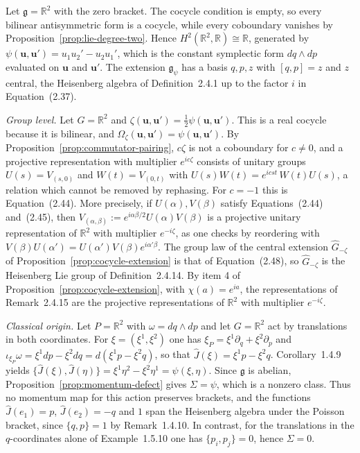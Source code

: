 \begin{example}\label{ex:heisenberg-extension}
	Let $\mathfrak{g}=\mathbb{R}^2$ with the zero bracket. The cocycle condition is empty, so every bilinear antisymmetric form is a cocycle, while every coboundary vanishes by Proposition~\ref{prop:lie-degree-two}. Hence $H^2(\mathbb{R}^2,\mathbb{R})\cong\mathbb{R}$, generated by $\psi(\mathbf{u},\mathbf{u}')=u_1u_2'-u_2u_1'$, which is the constant symplectic form $dq\wedge dp$ evaluated on $\mathbf{u}$ and $\mathbf{u}'$. The extension $\mathfrak{g}_\psi$ has a basis $q,p,z$ with $[q,p]=z$ and $z$ central, the Heisenberg algebra of Definition~2.4.1 up to the factor $i$ in Equation~(2.37).
	
	\emph{Group level.} Let $G=\mathbb{R}^2$ and $\zeta(\mathbf{u},\mathbf{u}')=\tfrac{1}{2}\psi(\mathbf{u},\mathbf{u}')$. This is a real cocycle because it is bilinear, and $\Omega_\zeta(\mathbf{u},\mathbf{u}')=\psi(\mathbf{u},\mathbf{u}')$. By Proposition~\ref{prop:commutator-pairing}, $c\zeta$ is not a coboundary for $c\neq0$, and a projective representation with multiplier $e^{ic\zeta}$ consists of unitary groups $U(s)=V_{(s,0)}$ and $W(t)=V_{(0,t)}$ with $U(s)W(t)=e^{icst}\,W(t)U(s)$, a relation which cannot be removed by rephasing. For $c=-1$ this is Equation~(2.44). More precisely, if $U(\alpha),V(\beta)$ satisfy Equations~(2.44) and~(2.45), then $V_{(\alpha,\beta)}:=e^{i\alpha\beta/2}U(\alpha)V(\beta)$ is a projective unitary representation of $\mathbb{R}^2$ with multiplier $e^{-i\zeta}$, as one checks by reordering with $V(\beta)U(\alpha')=U(\alpha')V(\beta)e^{i\alpha'\beta}$. The group law of the central extension $\widehat{G}_{-\zeta}$ of Proposition~\ref{prop:cocycle-extension} is that of Equation~(2.48), so $\widehat{G}_{-\zeta}$ is the Heisenberg Lie group of Definition~2.4.14. By item 4 of Proposition~\ref{prop:cocycle-extension}, with $\chi(a)=e^{ia}$, the representations of Remark~2.4.15 are the projective representations of $\mathbb{R}^2$ with multiplier $e^{-i\zeta}$.
	
	\emph{Classical origin.} Let $P=\mathbb{R}^2$ with $\omega=dq\wedge dp$ and let $G=\mathbb{R}^2$ act by translations in both coordinates. For $\xi=(\xi^1,\xi^2)$ one has $\xi_P=\xi^1\partial_q+\xi^2\partial_p$ and $\iota_{\xi_P}\omega=\xi^1dp-\xi^2dq=d(\xi^1p-\xi^2q)$, so that $\hat J(\xi)=\xi^1p-\xi^2q$. Corollary~1.4.9 yields $\{\hat J(\xi),\hat J(\eta)\}=\xi^1\eta^2-\xi^2\eta^1=\psi(\xi,\eta)$. Since $\mathfrak{g}$ is abelian, Proposition~\ref{prop:momentum-defect} gives $\Sigma=\psi$, which is a nonzero class. Thus no momentum map for this action preserves brackets, and the functions $\hat J(e_1)=p$, $\hat J(e_2)=-q$ and $1$ span the Heisenberg algebra under the Poisson bracket, since $\{q,p\}=1$ by Remark~1.4.10. In contrast, for the translations in the $q$-coordinates alone of Example~1.5.10 one has $\{p_i,p_j\}=0$, hence $\Sigma=0$.
\end{example}

